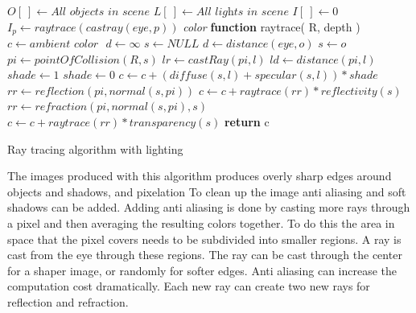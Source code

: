 \documentclass[11pt,a4paper,oneside]{article}
\begin{document}
\begin{algorithm}[H]
\begin{algorithmic}[1]
\STATE $O[\ ] \gets \textit{All objects in scene}$ 
\STATE $L[\ ] \gets \textit{All lights in scene}$
\STATE $I[\ ] \gets 0$ 
\STATE
{}
	\STATE $I_{p} \gets raytrace( castray( eye, p ))$
\ENDFOR
\STATE 
\STATE \textit{color} \textbf{function} raytrace(  R, depth )
	\STATE $c  \gets \textit{ambient color } $
	\STATE $d \gets \infty $
	\STATE $s \gets \textit{NULL}$
				\STATE $d \gets distance( \textit{eye}, o )$
				\STATE $s \gets o$
			\ENDIF
		\ENDIF
	\ENDFOR
		\STATE {}
		\STATE $pi \gets pointOfCollision( R, s )$
			\STATE $lr \gets castRay( pi, l )$
			\STATE $ld \gets distance( pi, l )$
			\STATE $shade \gets 1$
					\STATE $shade \gets 0$				
				\ENDIF
				\STATE $c \gets c +( diffuse( s, l ) + specular( s, l )) * shade$ 
			\ENDFOR
		\ENDFOR
		\STATE {}
			\STATE $rr \gets reflection( pi, normal( s, pi ))$
			\STATE $c \gets c + raytrace( rr ) * reflectivity( s )$
		\ENDIF
		\STATE {}
			\STATE $rr \gets refraction( pi, normal( s, pi ), s )$
			\STATE $c \gets c + raytrace( rr ) * transparency( s )$
		\ENDIF
	\ENDIF
	\STATE \textbf{return} c

\end{algorithmic}
\caption{ Ray tracing algorithm with lighting }
\label{ray-trace-full}
\end{algorithm}
\newpage

The images produced with this algorithm produces overly sharp edges around objects and shadows, and pixelation To clean up the image anti aliasing and soft shadows can be added.  Adding anti aliasing is done by casting more rays through a pixel and then averaging the resulting colors together.  To do this the area in space that the pixel covers needs to be subdivided into smaller regions.  A ray is cast from the eye through these regions.  The ray can be cast through the center for a shaper image, or randomly for softer edges.  Anti aliasing can increase the computation cost dramatically.  Each new ray can create two new rays for reflection and refraction.
\end{document}
